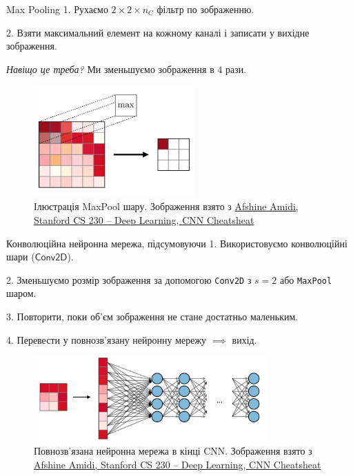\documentclass[xcolor={usenames,dvipsnames}]{beamer}
\begin{document}
    \begin{frame}{Max Pooling}
        1. Рухаємо $2\times 2 \times n_C$ фільтр по зображенню. 
        
        2. Взяти максимальний елемент на кожному каналі і записати у вихідне зображення.

        \textit{Навіщо це треба?} Ми зменьшуємо зображення в $4$ рази.

        \begin{figure}
        \centering
            \includegraphics[width=0.55\textwidth]{images/max-pooling-a.png}
            \caption{Ілюстрація MaxPool шару. \scriptsize Зображення взято з \href{https://stanford.edu/~shervine/teaching/cs-230/cheatsheet-convolutional-neural-networks}{Afshine Amidi, Stanford CS 230 -- Deep Learning, CNN Cheatsheat}}
        \end{figure}
    \end{frame}

    \begin{frame}{Конволюційна нейронна мережа, підсумовуючи}
        1. Використовуємо конволюційні шари ($\mathsf{Conv2D}$).
        
        2. Зменьшуємо розмір зображення за допомогою \texttt{Conv2D} з $s=2$ або \texttt{MaxPool} шаром.
        
        3. Повторити, поки об'єм зображення не стане достатньо маленьким.

        4. Перевести у повнозв'язану нейронну мережу $\implies$ вихід.

        \begin{figure}
        \centering
            \includegraphics[width=0.8\textwidth]{images/cnn.png}
            \caption{Повнозв'язана нейронна мережа в кінці CNN. \scriptsize Зображення взято з \href{https://stanford.edu/~shervine/teaching/cs-230/cheatsheet-convolutional-neural-networks}{Afshine Amidi, Stanford CS 230 -- Deep Learning, CNN Cheatsheat}}
        \end{figure}
    \end{frame}
\end{document}
